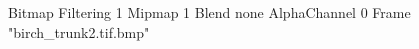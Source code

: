{Bitmap
	{Filtering 1}
	{Mipmap 1}
	{Blend none}
	{AlphaChannel 0}
	{Frame "birch_trunk2.tif.bmp"}
}
